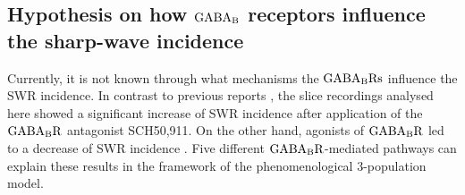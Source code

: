   \subsection{Hypothesis on how $\rm GABA_B$ receptors influence the sharp-wave incidence} 
    Currently, it is not known through what mechanisms the $\rm GABA_BRs$
    influence the SWR incidence. In contrast to previous reports
    \citep[e.g.,][]{Hollnagel2014, Hofer2015}, the slice recordings analysed
    here showed a significant increase of SWR incidence after application of the
    $\rm GABA_BR$ antagonist SCH50,911. On the other hand, agonists of $\rm
    GABA_BR$ led to a decrease of SWR incidence \citep{Maier2012,
    Hollnagel2014}. Five different $\rm GABA_BR$-mediated pathways can explain
    these results in the framework of the phenomenological 3-population model.
     
